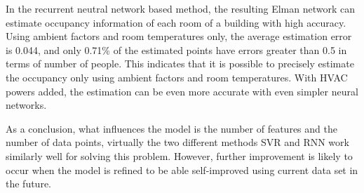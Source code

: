 \documentclass[acmtodaes]{acmtrans2m}
\begin{document}
In the recurrent neutral network based method, the resulting Elman
network can estimate occupancy information of each room of a building
with high accuracy. Using ambient factors and room temperatures only,
the average estimation error is 0.044, and only 0.71\% of the
estimated points have errors greater than 0.5 in terms of number of
people. This indicates that it is possible to precisely estimate the
occupancy only using ambient factors and room temperatures. With HVAC
powers added, the estimation can be even more accurate with even
simpler neural networks.

As a conclusion, what influences the model is the number of features
and the number of data points, virtually the two different methods SVR
and RNN work similarly well for solving this problem. However,
further improvement is likely to occur when the model is refined to be
able self-improved using current data set in the future.








%
%


\end{document}
